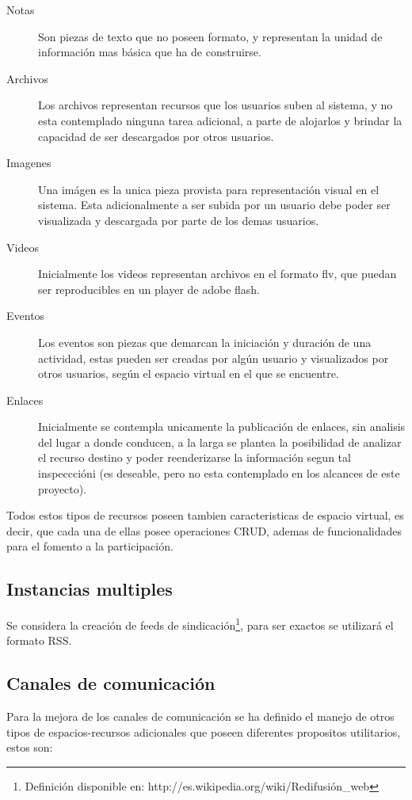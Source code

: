 \begin{description}
\item [Notas] Son piezas de texto que no poseen formato, y representan la unidad
de información mas básica que ha de construirse.
\item [Archivos] Los archivos representan recursos que los usuarios suben al
sistema, y no esta contemplado ninguna tarea adicional, a parte de alojarlos y
brindar la capacidad de ser descargados por otros usuarios.
\item [Imagenes] Una imágen es la unica pieza provista para representación
visual en el sistema. Esta adicionalmente a ser subida por un usuario debe
poder ser visualizada y descargada por parte de los demas usuarios.
\item [Videos] Inicialmente los videos representan archivos en el formato flv,
que puedan ser reproducibles en un player de adobe flash.
\item [Eventos] Los eventos son piezas que demarcan la iniciación y duración de
una actividad, estas pueden ser creadas por algún usuario y visualizados por
otros usuarios, según el espacio virtual en el que se encuentre.
\item [Enlaces] Inicialmente se contempla unicamente la publicación de enlaces,
sin analisis del lugar a donde conducen, a la larga se plantea la posibilidad de
analizar el recurso destino y poder reenderizarse la información segun tal
inspecccióni (es deseable, pero no esta contemplado en los alcances de este
proyecto).
\end{description}

Todos estos tipos de recursos poseen tambien caracteristicas de espacio virtual,
es decir, que cada una de ellas posee operaciones CRUD, ademas de
funcionalidades para el fomento a la participación.

\subsection{Instancias multiples}

Se considera la creación de feeds de
sindicación\footnote{Definición disponible en:
http://es.wikipedia.org/wiki/Redifusión\_web}, para ser exactos se utilizará
el formato RSS.

\subsection{Canales de comunicación}

Para la mejora de los canales de comunicación se ha definido el manejo de otros
tipos de espacios-recursos adicionales que poseen diferentes propositos
utilitarios, estos son:

